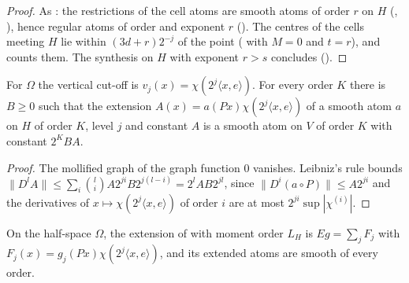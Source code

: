 \begin{proof}
\leanok
As : the restrictions of the cell atoms are smooth atoms of order $r$ on $H$
(, ), hence regular atoms of order
and exponent $r$ (). The centres of the cells meeting $H$ lie within
$(3d + r) 2^{-j}$ of the point ( with $M = 0$ and $t = r$), and
 counts them. The synthesis on $H$ with exponent $r > s$ concludes
().
\end{proof}

\begin{lemma}
\label{lem:extended-atoms-every-order}
\leanok
{}
For $\Omega$ the vertical cut-off is $v_j(x) = \chi(2^j \langle x, e \rangle)$. For every order $K$
there is $B \geq 0$ such that the extension $A(x) = a(Px) \chi(2^j \langle x, e \rangle)$ of a
smooth atom $a$ on $H$ of order $K$, level $j$ and constant $A$ is a smooth atom on $V$ of order
$K$ with constant $2^K B A$.
\end{lemma}

\begin{proof}
\leanok
The mollified graph of the graph function $0$ vanishes. Leibniz's rule bounds
$\|D^l A\| \leq \sum_i \binom{l}{i} A 2^{ji} B 2^{j(l-i)} = 2^l A B 2^{jl}$, since
$\|D^i (a \circ P)\| \leq A 2^{ji}$ and the derivatives of $x \mapsto \chi(2^j \langle x, e \rangle)$
of order $i$ are at most $2^{ji} \sup |\chi^{(i)}|$.
\end{proof}

On the half-space $\Omega$, the extension of  with moment order
$L_H$ is $E g = \sum_j F_j$ with $F_j(x) = g_j(Px) \chi(2^j \langle x, e \rangle)$, and its extended
atoms are smooth of every order.

